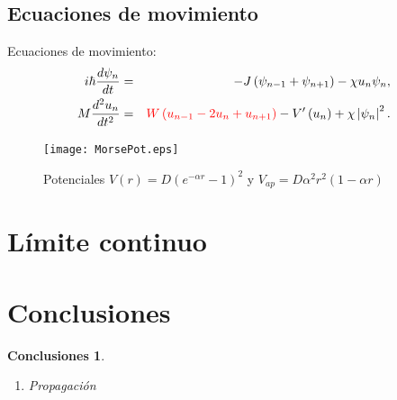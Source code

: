 \documentclass[10pt]{beamer}
\newtheorem{conclusiones}{Conclusiones}[section]
\newtheorem{final remarks}{final remarks}[section]
\newtheorem{future work collaboration}{future work collaboration}[section]
\begin{document}
\subsection{Ecuaciones de movimiento}
\begin{frame}
Ecuaciones de movimiento:
\begin{eqnarray}
i\hbar \frac{d\psi_{n}}{dt}&=&-J\left(\psi_{n-1}+\psi_{n+1}\right)-\chi u_n\psi_{n}, \notag \\
M \frac{d^2{u}_{n}}{dt^2}&=&\textcolor{red}{W\left(u_{n-1}-2u_{n}+u_{n+1}\right)}-V'\left(u_n\right)+\chi \left|\psi_{n}\right|^{2}.  \notag
\end{eqnarray}

\begin{figure}
\texttt{[image: MorsePot.eps]}
\caption{Potenciales $V(r)=D\left(e^{-\alpha r}-1\right)^2$ y $V_{ap}=D\alpha^2r^2\left(1-\alpha r\right)$}
\end{figure}

\end{frame}

\section{L\'imite continuo}

\begin{frame}



\end{frame}

\section{Conclusiones}
\begin{frame}

\begin{conclusiones}
\begin{enumerate}
\item Propagaci\'on 
\end{enumerate}
\end{conclusiones}

\end{frame}
\end{document}
